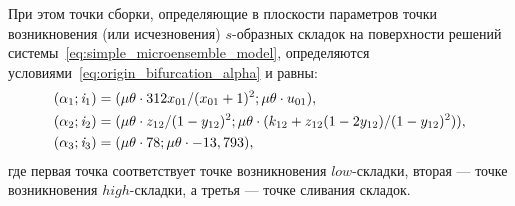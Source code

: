 При этом \socalled точки сборки, определяющие в плоскости параметров точки возникновения (или исчезновения) $s$-образных складок на поверхности решений системы~\eqref{eq:simple_microensemble_model}, определяются условиями~\eqref{eq:origin_bifurcation_alpha} и равны:
\begin{equation}
    \nonumber
    \begin{aligned}
        (\alpha_{1}; \mathit{i}_{1}) & = ( \mu \theta \cdot 312 x_{01} / (x_{01} + 1)^2 ; \mu \theta \cdot u_{01} ),\\
        (\alpha_{2}; \mathit{i}_{2}) & = ( \mu \theta \cdot z_{12} / (1 - y_{12})^2     ; \mu \theta \cdot (k_{12} + z_{12} (1 - 2 y_{12}) / (1 - y_{12})^{2}) ),\\
        (\alpha_{3}; \mathit{i}_{3}) & = ( \mu \theta \cdot 78                          ; \mu \theta \cdot -13,793 ),\\
    \end{aligned}    
\end{equation}
где первая точка соответствует точке возникновения $low$-складки, вторая --- точке возникновения $high$-складки, а третья --- точке сливания складок.

